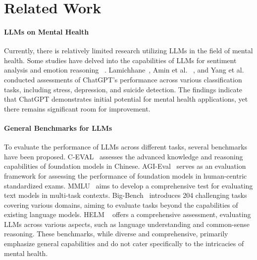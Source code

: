 
\section{Related Work}
\paragraph*{LLMs on Mental Health}
Currently, there is relatively limited research utilizing LLMs in the field of mental health. Some studies have delved into the capabilities of LLMs for sentiment analysis and emotion reasoning ~\cite{kocon2023chatgpt, qin2023chatgpt, zhong2023can}. Lamichhane~\cite{Lamichhane2023chatgptapp}, Amin et al. ~\cite{amin2023will}, and Yang et al.~\cite{yang2023evaluations} conducted assessments of ChatGPT's performance across various classification tasks, including stress, depression, and suicide detection. The findings indicate that ChatGPT demonstrates initial potential for mental health applications, yet there remains significant room for improvement.

\paragraph*{General Benchmarks for LLMs}
To evaluate the performance of LLMs across different tasks, several benchmarks have been proposed. C-EVAL~\cite{huang2023ceval} assesses the advanced knowledge and reasoning capabilities of foundation models in Chinese. AGI-Eval~\cite{zhong2023agieval} serves as an evaluation framework for assessing the performance of foundation models in human-centric standardized exams. MMLU~\cite{hendrycks2021measuring} aims to develop a comprehensive test for evaluating text models in multi-task contexts. Big-Bench~\cite{srivastava2023beyond} introduces 204 challenging tasks covering various domains, aiming to evaluate tasks beyond the capabilities of existing language models. HELM ~\cite{helm2023liang} offers a comprehensive assessment, evaluating LLMs across various aspects, such as language understanding and common-sense reasoning. 
These benchmarks, while diverse and comprehensive, primarily emphasize general capabilities and do not cater specifically to the intricacies of mental health.

